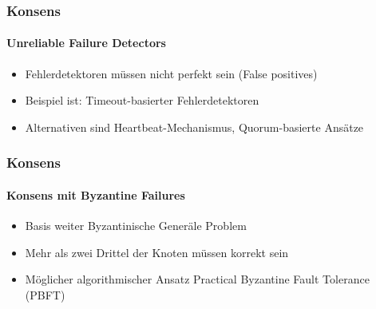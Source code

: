 \begin{frame}
  \frametitle{Konsens}
  \framesubtitle{Unreliable Failure Detectors }
  \begin{itemize}
    \item Fehlerdetektoren müssen nicht perfekt sein (False positives)
    \item Beispiel ist: Timeout-basierter Fehlerdetektoren
    \item Alternativen sind Heartbeat-Mechanismus, Quorum-basierte Ansätze
  \end{itemize}
\end{frame}

\begin{frame}
  \frametitle{Konsens}
  \framesubtitle{Konsens mit Byzantine Failures}
  \begin{itemize}
    \item Basis weiter Byzantinische Generäle Problem
    \item Mehr als zwei Drittel der Knoten müssen korrekt sein
    \item Möglicher algorithmischer Ansatz Practical Byzantine Fault Tolerance (PBFT)
  \end{itemize}
\end{frame}

